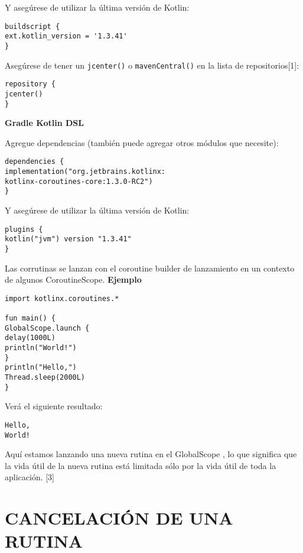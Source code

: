 \documentclass[twocolumn,10pt,abstract=on]{asme2ej}
\begin{document}
Y asegúrese de utilizar la última versión de Kotlin:

\begin{verbatim}
buildscript {
ext.kotlin_version = '1.3.41'
}
\end{verbatim}

Asegúrese de tener un  \verb+jcenter()+ o   \verb+mavenCentral()+ en la lista de repositorios[1]:

\begin{verbatim}
repository {
jcenter()
}
\end{verbatim}

\smallbreak
\begin{flushleft}
\textbf{%
	\large {Gradle Kotlin DSL}}
\end{flushleft}

Agregue dependencias (también puede agregar otros módulos que necesite):

\begin{verbatim}
dependencies {
implementation("org.jetbrains.kotlinx:
kotlinx-coroutines-core:1.3.0-RC2")
}
\end{verbatim}

Y asegúrese de utilizar la última versión de Kotlin:

\begin{verbatim}
plugins {
kotlin("jvm") version "1.3.41"
}
\end{verbatim}

	Las corrutinas se lanzan con el coroutine builder de lanzamiento en un contexto de algunos  CoroutineScope.\linebreak
\smallbreak
\textbf{%
	\large {Ejemplo}}

\begin{verbatim}
import kotlinx.coroutines.*

fun main() {
GlobalScope.launch { 
delay(1000L)
println("World!")
}
println("Hello,")
Thread.sleep(2000L)
}
\end{verbatim}

Verá el siguiente resultado:

\begin{verbatim}
Hello,
World!
\end{verbatim}

Aquí estamos lanzando una nueva rutina en el GlobalScope , lo que significa que la vida útil de la nueva rutina está limitada sólo por la vida útil de toda la aplicación. [3]

\section{CANCELACIÓN DE UNA RUTINA}
\end{document}
